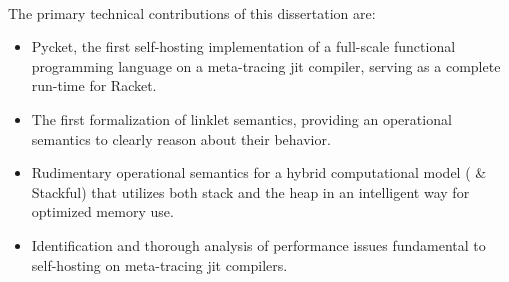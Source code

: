         \paragraph{}%
            The primary technical contributions of this dissertation are:
            \begin{itemize}
                \item Pycket, the first self-hosting implementation of a full-scale functional programming language on a meta-tracing \gls{jit} compiler, serving as a complete run-time for Racket. %
                \item The first formalization of linklet semantics, providing an operational semantics to clearly reason about their behavior. %
                \item Rudimentary operational semantics for a hybrid computational model ( \& Stackful) that utilizes both stack and the heap in an intelligent way for optimized memory use. %
                \item Identification and thorough analysis of performance issues fundamental to self-hosting on meta-tracing \gls{jit} compilers. %
            \end{itemize}







